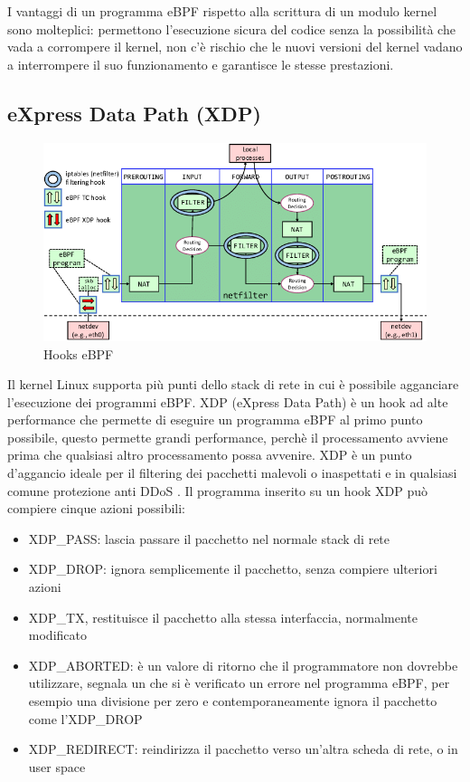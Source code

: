 I vantaggi di un programma eBPF rispetto alla scrittura di un modulo kernel sono molteplici: permettono l'esecuzione sicura del codice senza la possibilità che vada a corrompere il kernel, non c'è rischio che le nuovi versioni del kernel vadano a interrompere il suo funzionamento e garantisce le stesse prestazioni.


\subsection{eXpress Data Path (XDP)}
\begin{figure}[]
    \label{fig:hooks}
    \includegraphics[width=\hsize]{images/mitigazione/hooks.png}
    \caption{Hooks eBPF}
    \centering
\end{figure}
Il kernel Linux supporta più punti dello stack di rete in cui è possibile agganciare l'esecuzione dei programmi eBPF.
XDP (eXpress Data Path) è un hook ad alte performance che permette di eseguire un programma eBPF al primo punto possibile, questo permette grandi performance, perchè il processamento avviene prima che qualsiasi altro processamento possa avvenire. XDP è un punto d'aggancio ideale per il filtering dei pacchetti malevoli o inaspettati e in qualsiasi comune protezione anti DDoS \cite{cilium_xdp}.
Il programma inserito su un hook XDP può compiere cinque azioni possibili:
\begin{itemize}
    \item XDP\_PASS: lascia passare il pacchetto nel normale stack di rete
    \item XDP\_DROP: ignora semplicemente il pacchetto, senza compiere ulteriori azioni
    \item XDP\_TX, restituisce il pacchetto alla stessa interfaccia, normalmente modificato
    \item XDP\_ABORTED: è un valore di ritorno che il programmatore non dovrebbe utilizzare, segnala un che si è verificato un errore nel programma eBPF, per esempio una divisione per zero e contemporaneamente ignora il pacchetto come l'XDP\_DROP
    \item XDP\_REDIRECT: reindirizza il pacchetto verso un'altra scheda di rete, o in user space
\end{itemize}


